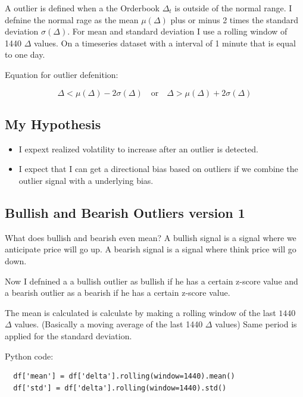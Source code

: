 \documentclass[12pt]{article}
\begin{document}
A outlier is defined when a the Orderbook $\Delta_t$ is outside of the normal range. I defnine the normal rage as the mean $\mu(\Delta)$ plus or minus 2 times the standard deviation $\sigma(\Delta)$. For mean and standard deviation I use a rolling window of 1440 $\Delta$ values. On a timeseries dataset with a interval of 1 minute that is equal to one day.

Equation for outlier defenition:



\begin{equation}\label{eq: outlier_detection}
  \Delta < \mu(\Delta) - 2\sigma(\Delta) \quad \text{or} \quad \Delta > \mu(\Delta) + 2\sigma(\Delta)    
\end{equation}


 \subsection{My Hypothesis}

\begin{itemize}
  \item I expext realized volatility to increase after an outlier is detected.
  \item I expect that I can get a directional bias based on outliers if we combine the outlier signal with a underlying bias.
\end{itemize}



\subsection{Bullish and Bearish Outliers version 1}
What does bullish and bearish even mean? A bullish signal is a signal where we anticipate price will go up. A bearish signal is a signal where think price will go down.

Now I defnined a a bullish outlier as bullish if he has a certain z-score value and a bearish outlier as a bearish if he has a certain z-score value.

The mean is calculated is calculate by making a rolling window of the last $1440$ $\Delta$ values. (Basically a moving average of the last 1440 $\Delta$ values)
Same period is applied for the standard deviation.

Python code:
\begin{verbatim}
  df['mean'] = df['delta'].rolling(window=1440).mean()
  df['std'] = df['delta'].rolling(window=1440).std()
\end{verbatim}
\end{document}
